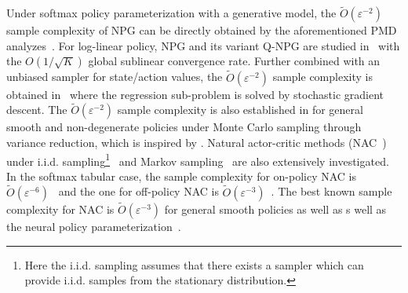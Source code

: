 \documentclass[10pt]{article}
\theoremstyle{plain}
\theoremstyle{definition}
\begin{document}
Under softmax policy parameterization with a generative model, the $\tilde O(\varepsilon^{-2})$ sample complexity of NPG can be directly obtained by the aforementioned PMD analyzes~\citep{Xiao_2022,Lan_2021,Johnson_Pike-Burke_Rebeschini_2023}. For log-linear policy, NPG and its variant Q-NPG are studied in~\citet{Agarwal_Kakade_Lee_Mahajan_2019} with the $O(1/\sqrt{K})$ global sublinear convergence rate. Further combined with an unbiased sampler for state/action values, the $\tilde O(\varepsilon^{-2})$ sample complexity is obtained in~\citet{yuan2022linear} where  the regression sub-problem is solved by stochastic gradient descent. The $\tilde O(\varepsilon^{-2})$ sample complexity is also established in \citet{feng2024global} for general smooth and non-degenerate policies under Monte Carlo sampling through variance reduction, which is inspired by \citet{pmlr-v202-fatkhullin23a}. 
Natural actor-critic methods (NAC~\citep{konda2000ac,peters2008natural}) under i.i.d. sampling\footnote{Here the i.i.d. sampling assumes that there exists a sampler which can provide i.i.d. samples from the stationary distribution.}~\citep{wang2019neural,fu2021single} and Markov sampling~\citep{khodadadian2021finite,khodadadian2022finite,gaur2024closing,wang2024non,xu2020improving,xu2020non,cayci2022finite} are also extensively investigated. In the softmax tabular case, the sample complexity for on-policy NAC is $\tilde O(\varepsilon^{-6})$~\citep{khodadadian2022finite} and the one for off-policy NAC is $\tilde O(\varepsilon^{-3})$~\citep{khodadadian2021finite}.%
 The best known sample complexity for NAC  is $\tilde O(\varepsilon^{-3})$ for general smooth policies as well as s well as the neural policy parameterization~\citep{xu2020improving,wang2024non,gaur2024closing}. %

\end{document}
